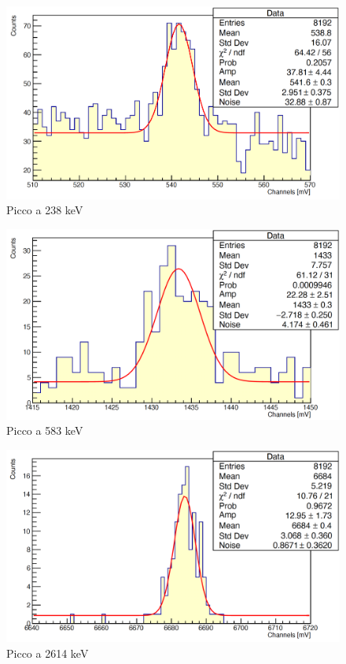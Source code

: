 \documentclass[a4paper,10pt]{article}
\begin{document}
\begin{figure}[H]
    \centering
    \includegraphics[scale=0.45]{appendice/spettri/ThA1_20}
    \caption{Picco a 238 keV}
\end{figure}
\begin{figure}[H]
    \centering
    \includegraphics[scale=0.45]{appendice/spettri/ThA2_20}
    \caption{Picco a 583 keV}
\end{figure}
\begin{figure}[H]
    \centering
    \includegraphics[scale=0.45]{appendice/spettri/ThA3_20}
    \caption{Picco a 2614 keV}
\end{figure}
\end{document}
